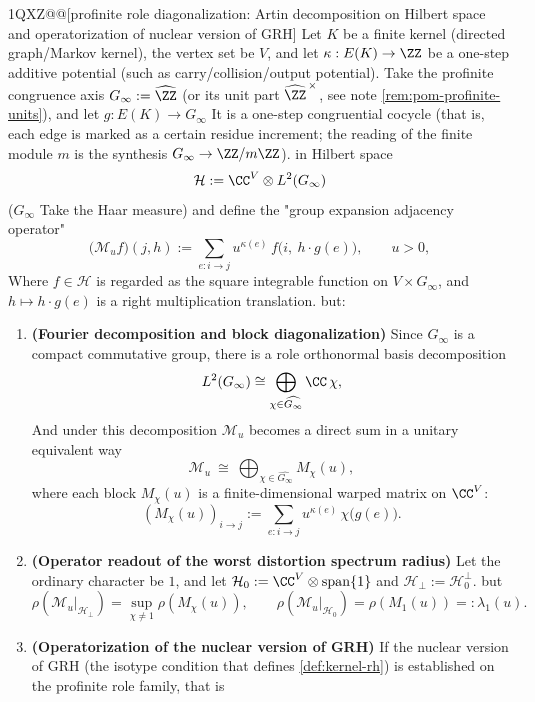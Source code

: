 {\begin@@ZXQPH1QXZ@@[profinite role diagonalization: Artin decomposition on Hilbert space and operatorization of nuclear version of GRH]\label{prop:pom-profinite-artin-hilbert}
Let \(K\) be a finite kernel (directed graph/Markov kernel), the vertex set be \(V\), and let \(\kappa:E(K)\to\ZZ\) be a one-step additive potential (such as carry/collision/output potential).
Take the profinite congruence axis \(G_\infty:=\widehat{\ZZ}\) (or its unit part \(\widehat{\ZZ}^{\,\times}\), see note \ref{rem:pom-profinite-units}), and let
\(
g:E(K)\to G_\infty
\)
It is a one-step congruential cocycle (that is, each edge is marked as a certain residue increment; the reading of the finite module \(m\) is the synthesis \(G_\infty\to\ZZ/m\ZZ\)).
in Hilbert space
\[
\mathcal{H}:=\CC^{V}\otimes L^2(G_\infty)
\]
(\(G_\infty\) Take the Haar measure) and define the "group expansion adjacency operator"
\[
\bigl(\mathcal{M}_u f\bigr)(j,h)
:=\sum_{e:i\to j} u^{\kappa(e)}\, f\!\bigl(i,\ h\cdot g(e)\bigr),
\qquad u>0,
\]
Where \(f\in\mathcal{H}\) is regarded as the square integrable function on \(V\times G_\infty\), and \(h\mapsto h\cdot g(e)\) is a right multiplication translation.
but:
\begin{enumerate}
\item \textbf{(Fourier decomposition and block diagonalization)} Since \(G_\infty\) is a compact commutative group, there is a role orthonormal basis decomposition
  \[
  L^2(G_\infty)\cong \bigoplus_{\chi\in\widehat{G_\infty}}\CC\,\chi,
  \]
And under this decomposition \(\mathcal{M}_u\) becomes a direct sum in a unitary equivalent way
  \[
  \mathcal{M}_u\ \cong\ \bigoplus_{\chi\in\widehat{G_\infty}} M_\chi(u),
  \]
where each block \(M_\chi(u)\) is a finite-dimensional warped matrix on \(\CC^{V}\):
  \[
  (M_\chi(u))_{i\to j}:=\sum_{e:i\to j} u^{\kappa(e)}\,\chi\!\bigl(g(e)\bigr).
  \]
\item \textbf{(Operator readout of the worst distortion spectrum radius)} Let the ordinary character be \(1\), and let
  \(
  \mathcal{H}_0:=\CC^V\otimes\mathrm{span}\{1\}
  \)
and \(\mathcal{H}_\perp:=\mathcal{H}_0^\perp\).
but
  \[
  \rho\!\left(\mathcal{M}_u|_{\mathcal{H}_\perp}\right)
  =\sup_{\chi\neq 1}\rho\!\left(M_\chi(u)\right),
  \qquad
  \rho\!\left(\mathcal{M}_u|_{\mathcal{H}_0}\right)=\rho\!\left(M_1(u)\right)=:\lambda_1(u).
  \]
\item \textbf{(Operatorization of the nuclear version of GRH)} If the nuclear version of GRH (the isotype condition that defines \ref{def:kernel-rh}) is established on the profinite role family, that is

\end{enumerate}}
